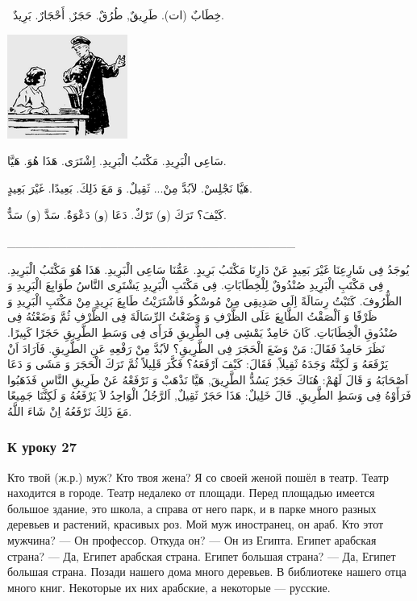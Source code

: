 \documentclass[a5paper]{article}
\begin{document}
\ خِطَابٌ (ات). طَرِيقٌ, طُرُقٌ. حَجَرٌ, أَحْجَارٌ. بَرِيدٌ.

 \includegraphics[width=1.552in,height=1.3437in]{MuhammadBagauddinlatinized-img155.png} 

سَاعِى الْبَرِيدِ. مَكْتَبُ الْبَرِيدِ. اِشْتَرَى. هَذَا هُوَ. هَيَّا.

هَيَّا نَجْلِسْ. لاَبُدَّ مِنْ... ثَقِيلٌ. وَ مَعَ ذَلِكَ. بَعِيدًا. غَيْرَ بَعِيدٍ.

كَيْفَ؟ تَرَكَ (و) تَرْكٌ. دَعَا (و) دَعْوَةٌ. سَدَّ (و) سَدٌّ.

\_\_\_\_\_\_\_\_\_\_\_\_\_\_\_\_\_\_\_\_\_\_\_\_\_\_\_\_\_\_\_\_\_\_

يُوجَدُ فِى شَارِعِنَا غَيْرَ بَعِيدٍ عَنْ دَارِنَا مَكْتَبُ بَرِيدٍ. عَمُّنَا سَاعِى الْبَرِيدِ. هَذَا هُوَ مَكْتَبُ الْبَرِيدِ. فِى مَكْتَبِ الْبَرِيدِ صُنْدُوقٌ لِلْخِطَابَاتِ. فِى مَكْتَبِ الْبَرِيدِ يَشْتَرِى النَّاسُ طَوَابِعَ الْبَرِيدِ وَ الظُّرُوفَ. كَتَبْتُ رِسَالَةً اِلَى صَدِيقِى مِنْ مُوسْكُو فَاشْتَرَيْتُ طَابِعَ بَرِيدٍ مِنْ مَكْتَبِ الْبَرِيدِ وَ ظَرْفًا وَ اَلْصَقْتُ الطَّابِعَ عَلَى الظَّرْفِ وَ وَضَعْتُ الرِّسَالَةَ فِى الظَّرْفِ ثُمَّ وَضَعْتُهُ فِى صُنْدُوقِ الْخِطَابَاتِ. كَانَ حَامِدٌ يَمْشِى فِى الطَّرِيقِ فَرَأَى فِى وَسَطِ الطَّرِيقِ حَجَرًا كَبِيرًا. نَظَرَ حَامِدٌ فَقَالَ: مَنْ وَضَعَ الْحَجَرَ فِى الطَّرِيقِ؟ لاَبُدَّ مِنْ رَفْعِهِ عَنِ الطَّرِيقِ. فَاَرَادَ اَنْ يَرْفَعَهُ وَ لَكِنَّهُ وَجَدَهُ ثَقِيلاً, فَقَالَ: كَيْفَ اَرْفَعَهُ؟ فَكَّرَ قَلِيلاً ثُمَّ تَرَكَ الْحَجَرَ وَ مَشَى وَ دَعَا اَصْحَابَهُ وَ قَالَ لَهُمْ: هُنَاكَ حَجَرٌ يَسُدُّ الطَّرِيقَ, هَيَّا نَذْهَبْ وَ نَرْفَعْهُ عَنْ طَرِيقِ النَّاسِ فَذَهَبُوا فَرَأَوْهُ فِى وَسَطِ الطَّرِيقِ. قَالَ خَلِيلٌ: هَذَا حَجَرٌ ثَقِيلٌ, اَلرَّجُلُ الْوَاحِدُ لاَ يَرْفَعُهُ وَ لَكِنَّنَا جَمِيعًا مَعَ ذَلِكَ نَرْفَعُهُ اِنْ شَاءَ اللَّهُ.

\subsubsection{К уроку 27}
Кто твой (ж.р.) муж? Кто твоя жена? Я со своей женой пошёл в театр. Театр находится в городе. Театр недалеко от площади. Перед площадью имеется большое здание, это школа, а справа от него парк, и в парке много разных деревьев и растений, красивых роз. Мой муж иностранец, он араб. Кто этот мужчина? — Он профессор. Откуда он? — Он из Египта. Египет арабская страна? — Да, Египет арабская страна. Египет большая страна? — Да, Египет большая страна. Позади нашего дома много деревьев. В библиотеке нашего отца много книг. Некоторые их них арабские, а некоторые — русские.
\end{document}
